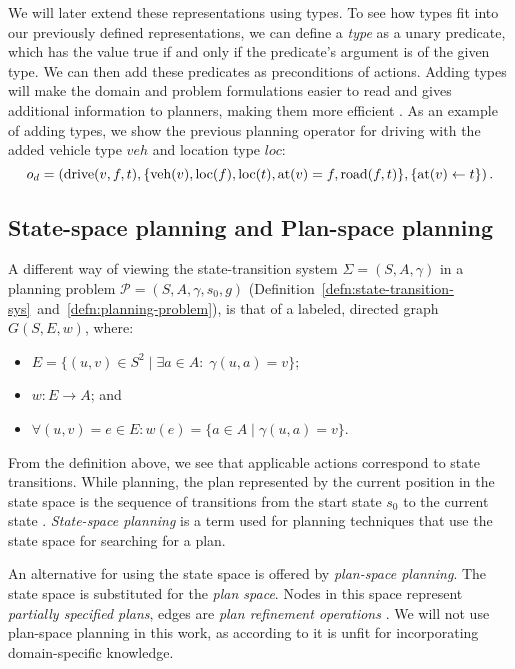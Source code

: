 We will later extend these representations using types.
To see how types fit into our previously defined representations, we can
define a \textit{type} as a unary predicate, which has the value true
if and only if the predicate's argument is of the given type.
We can then add these predicates as preconditions of actions.
Adding types will make the domain and problem formulations
easier to read and gives additional information
to planners, making them more efficient \citep[Section 2.4.1]{Ghallab2004}. As an example of adding types, we show the previous planning operator for driving with the added vehicle type $veh$ and location type $loc$:
$$o_d = \left(\textrm{drive}(v, f, t), \{\textrm{veh}(v), \textrm{loc}(f), \textrm{loc}(t), \textrm{at}(v) = f, \textrm{road}(f, t)\}, \{\textrm{at}(v) \leftarrow t\}\right).$$

\subsection{State-space planning and Plan-space planning}

A different way of viewing the state-transition system $\Sigma = (S, A, \gamma)$ in a
planning problem $\mathcal{P} = (S, A, \gamma, s_0, g)$ (Definition~\ref{defn:state-transition-sys}~and~\ref{defn:planning-problem}), is that of a labeled, directed graph $G(S, E, w)$, where:
\begin{itemize}
\item $E = \{(u, v) \in S^2 \;|\; \exists a \in A : \; \gamma(u, a) = v\}$;
\item $w: E \to A$; and
\item $\forall (u, v) = e \in E : w(e) = \{a \in A \;|\; \gamma(u, a) = v\}$. 
\end{itemize}
From the definition above, we see that applicable actions correspond to state transitions. While planning, the plan represented by the current position in
the state space is the sequence of transitions from the start
state $s_0$ to the current state \citep[Section~4.1]{Ghallab2004}.
\textit{State-space planning} is a term used for planning techniques
that use the state space for searching for a plan.

An alternative for using the state space is offered by \textit{plan-space planning}.
The state space is substituted for the \textit{plan space}.
Nodes in this space represent \textit{partially specified plans},
edges are \textit{plan refinement operations} \citep[Section~5.1]{Ghallab2004}.
We will not use plan-space planning in this work, as according to
\citet[Section~5.6]{Ghallab2004} it is unfit for
incorporating domain-specific knowledge.

